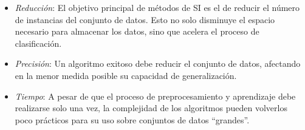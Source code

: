 \begin{itemize}
\item \emph{Reducción}: El objetivo principal de métodos de SI es el de reducir el número de instancias del conjunto de datos. Esto no solo disminuye el espacio necesario para almacenar los datos, sino que acelera el proceso de clasificación.
\item \emph{Precisión}: Un algoritmo exitoso debe reducir el conjunto de datos, afectando en la menor medida posible su capacidad de generalización.
\item \emph{Tiempo}: A pesar de que el proceso de preprocesamiento y aprendizaje debe realizarse solo una vez, la complejidad de los algoritmos pueden volverlos poco prácticos para su uso sobre conjuntos de datos ``grandes''.
\end{itemize}
